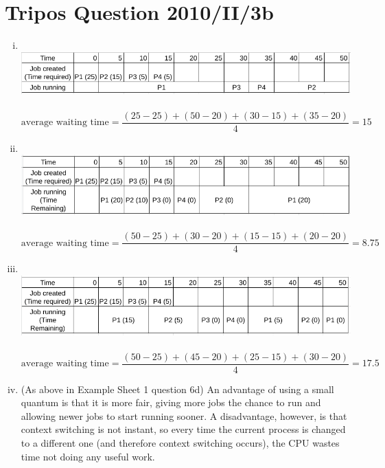\documentclass[12pt]{article}
\begin{document}
\section{Tripos Question 2010/II/3b}
\begin{enumerate}[(i)]
      \item \(\)\\ \includegraphics[scale=0.5]{3-sjf.png}\\\\
            $\text{average waiting time} = \dfrac{(25 - 25) + (50 - 20) + (30 - 15) + (35 - 20)}{4} = 15$
      \item \(\)\\ \includegraphics[scale=0.5]{3-srtf.png}\\\\
            $\text{average waiting time} = \dfrac{(50 - 25) + (30 - 20) + (15 - 15) + (20 - 20)}{4} = 8.75$
      \item \(\)\\ \includegraphics[scale=0.5]{3-rr.png}\\\\
            $\text{average waiting time} = \dfrac{(50 - 25) + (45 - 20) + (25 - 15) + (30 - 20)}{4} = 17.5$
      \item (As above in Example Sheet 1 question 6d) An advantage of using a small quantum is that it is more fair, giving more jobs the chance to run and allowing newer jobs to start running sooner. A disadvantage, however, is that context switching is not instant, so every time the current process is changed to a different one (and therefore context switching occurs), the CPU wastes time not doing any useful work.
\end{enumerate}
\end{document}
